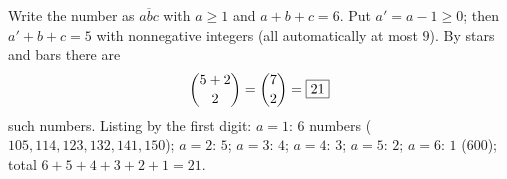 Write the number as $\overline{abc}$ with $a\ge1$ and $a+b+c=6$. Put $a'=a-1\ge0$; then $a'+b+c=5$ with nonnegative integers (all automatically at most $9$). By stars and bars there are
\[
\dbinom{5+2}{2}=\dbinom72=\boxed{21}
\]
such numbers. Listing by the first digit: $a=1$: $6$ numbers ($105,114,123,132,141,150$); $a=2$: $5$; $a=3$: $4$; $a=4$: $3$; $a=5$: $2$; $a=6$: $1$ ($600$); total $6+5+4+3+2+1=21$.

